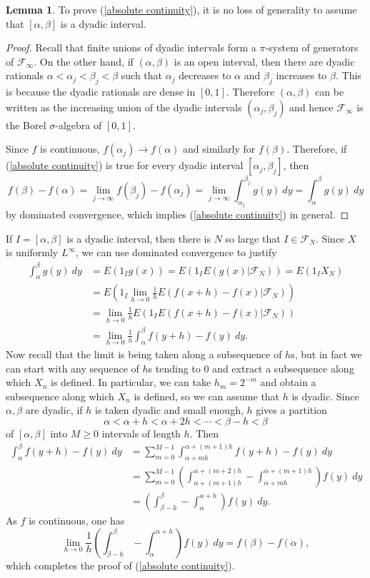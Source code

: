 \documentclass[10pt]{article}
\theoremstyle{definition}
\newtheorem{lemma}{Lemma}[exer]
\begin{document}
\begin{lemma}
To prove (\ref{absolute continuity}), it is no loss of generality to assume that $[\alpha, \beta]$ is a dyadic interval.
\end{lemma}
\begin{proof}
Recall that finite unions of dyadic intervals form a $\pi$-system of generators of $\mathcal F_\infty$.
On the other hand, if $(\alpha, \beta)$ is an open interval, then there are dyadic rationals $\alpha < \alpha_j < \beta_j < \beta$ such that $\alpha_j$ decreases to $\alpha$ and $\beta_j$ increases to $\beta$.
This is because the dyadic rationals are dense in $[0, 1]$.
Therefore $(\alpha, \beta)$ can be written as the increasing union of the dyadic intervals $(\alpha_j, \beta_j)$ and hence $\mathcal F_\infty$ is the Borel $\sigma$-algebra of $[0, 1]$.

Since $f$ is continuous, $f(\alpha_j) \to f(\alpha)$ and similarly for $f(\beta)$.
Therefore, if (\ref{absolute continuity}) is true for every dyadic interval $[\alpha_j, \beta_j]$, then
$$f(\beta) - f(\alpha) = \lim_{j \to \infty} f(\beta_j) - f(\alpha_j) = \lim_{j \to \infty} \int_{\alpha_j}^{\beta_j} g(y) ~dy = \int_\alpha^\beta g(y) ~dy$$
by dominated convergence, which implies (\ref{absolute continuity}) in general.
\end{proof}

If $I = [\alpha, \beta]$ is a dyadic interval, then there is $N$ so large that $I \in \mathcal F_N$.
Since $X$ is uniformly $L^\infty$, we can use dominated convergence to justify
\begin{align*}
\int_\alpha^\beta g(y) ~dy &= E(1_I g(x)) = E(1_I E(g(x)|\mathcal F_N)) = E(1_I X_N)\\
&= E\left(1_I \lim_{h \to 0} \frac{1}{h} E(f(x+h) - f(x)|\mathcal F_N)\right)\\
&= \lim_{h \to 0} \frac{1}{h} E(1_I E(f(x+h) - f(x)|\mathcal F_N))\\
&= \lim_{h \to 0} \frac{1}{h} \int_\alpha^\beta f(y + h) - f(y) ~dy.
\end{align*}
Now recall that the limit is being taken along a subsequence of $h$s, but in fact we can start with any sequence of $h$s tending to $0$ and extract a subsequence along which $X_n$ is defined.
In particular, we can take $h_m = 2^{-m}$ and obtain a subsequence along which $X_n$ is defined, so we can assume that $h$ is dyadic.
Since $\alpha, \beta$ are dyadic, if $h$ is taken dyadic and small enough, $h$ gives a partition
$$\alpha < \alpha + h < \alpha + 2h < \cdots < \beta - h < \beta$$
of $[\alpha, \beta]$ into $M \geq 0$ intervals of length $h$.
Then
\begin{align*}
\int_\alpha^\beta f(y + h) - f(y) ~dy &= \sum_{m=0}^{M - 1} \int_{\alpha + mh}^{\alpha + (m+1)h} f(y + h) - f(y) ~dy\\
&= \sum_{m=0}^{M-1} \left(\int_{\alpha + (m+1)h}^{\alpha + (m+2)h} - \int_{\alpha + mh}^{\alpha + (m+1)h}\right) f(y) ~dy\\
&= \left(\int_{\beta - h}^\beta - \int_\alpha^{\alpha + h}\right) f(y) ~dy.
\end{align*}
As $f$ is continuous, one has
$$\lim_{h \to 0} \frac{1}{h} \left(\int_{\beta - h}^\beta - \int_\alpha^{\alpha + h}\right) f(y) ~dy = f(\beta) - f(\alpha),$$
which completes the proof of (\ref{absolute continuity}).
\end{document}
